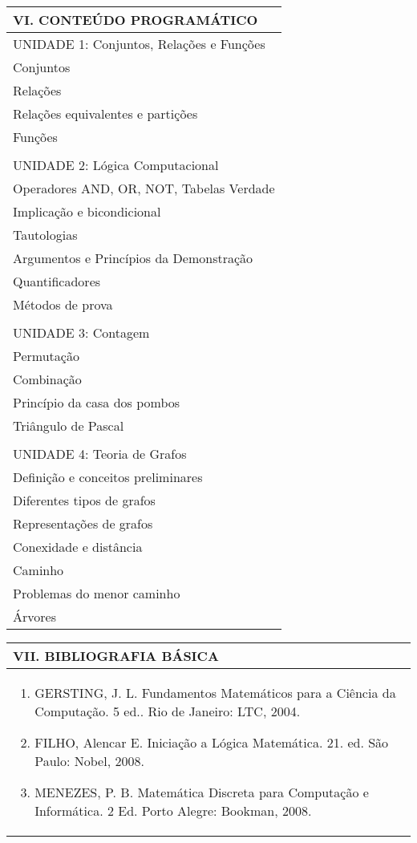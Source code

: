 \documentclass[12pt]{article}
\begin{document}
\begin{longtable}{|L{1.025\textwidth}|} \hline
%
{\bf VI. CONTEÚDO PROGRAMÁTICO } \\ \hline

UNIDADE 1: Conjuntos, Relações e Funções \\

Conjuntos\\
Relações\\
Relações equivalentes e partições\\
Funções\\
\\
UNIDADE 2: Lógica Computacional \\

Operadores AND, OR, NOT, Tabelas Verdade\\
Implicação e bicondicional\\
Tautologias\\
Argumentos e Princípios da Demonstração\\
Quantificadores \\
Métodos de prova\\
\\
UNIDADE 3: Contagem \\

Permutação\\
Combinação\\
Princípio da casa dos pombos\\
Triângulo de Pascal\\
\\
UNIDADE 4: Teoria de Grafos \\

Definição e conceitos preliminares\\
Diferentes tipos de grafos\\
Representações de grafos\\
Conexidade e distância\\
Caminho\\
Problemas do menor caminho\\
Árvores
\\ \hline
\end{longtable} 





\begin{longtable}{|L{1.025\textwidth}|} \hline
%
{\bf VII. BIBLIOGRAFIA BÁSICA} \\ \hline
\begin{enumerate}
%
\item GERSTING, J. L. Fundamentos Matemáticos para a Ciência da Computação. 5 ed.. Rio de Janeiro: LTC, 2004. 
\item FILHO, Alencar E. Iniciação a Lógica Matemática. 21. ed. São Paulo: Nobel, 2008. 
\item MENEZES, P. B. Matemática Discreta para Computação e Informática. 2 Ed. Porto Alegre: Bookman, 2008.

%

\end{enumerate}
 \\ \hline
\end{longtable}
\end{document}
